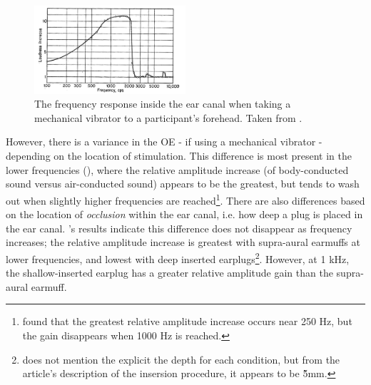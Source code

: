 \documentclass[dissertation,copyright]{uathesis}
\begin{document}
\begin{figure}
\includegraphics[width=0.5\textwidth]{figure/bekesy60-1.png}
\caption{The frequency response inside the ear canal when taking a mechanical vibrator to a participant's forehead.  Taken from \cite{bekesy:60}.}
\label{fig:bekesyOEresponse}
\end{figure}

However, there is a variance in the OE - if using a mechanical vibrator - depending on the location of stimulation.  This difference is most present in the lower frequencies (\cite{dean:00}), where the relative amplitude increase (of body-conducted sound versus air-conducted sound) appears to be the greatest, but tends to wash out when slightly higher frequencies are reached\footnote{\cite{dean:00} found that the greatest relative amplitude increase occurs near 250 Hz, but the gain disappears when 1000 Hz is reached.}.  There are also differences based on the location of \textit{occlusion} within the ear canal, i.e. how deep a plug is placed in the ear canal. \cite{dean:00}'s results indicate this difference does not disappear as frequency increases; the relative amplitude increase is greatest with supra-aural earmuffs at lower frequencies, and lowest with deep inserted earplugs\footnote{\cite{dean:00} does not mention the explicit the depth for each condition, but from the article's description of the insersion procedure, it appears to be \~5mm.}. However, at 1 kHz, the shallow-inserted earplug has a greater relative amplitude gain than the supra-aural earmuff.
\end{document}

